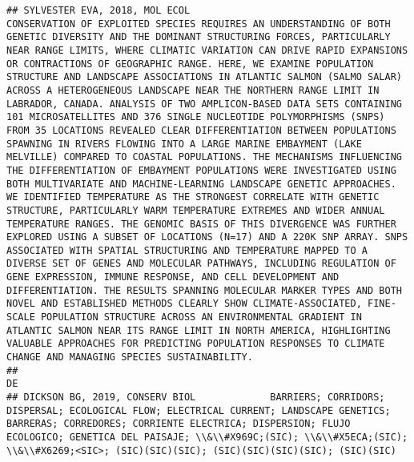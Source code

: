 \documentclass[]{article}
\begin{document}
\begin{verbatim}
## SYLVESTER EVA, 2018, MOL ECOL                                                                                                                                                                                                                                                                                                                                                                                                                                                                                                           CONSERVATION OF EXPLOITED SPECIES REQUIRES AN UNDERSTANDING OF BOTH GENETIC DIVERSITY AND THE DOMINANT STRUCTURING FORCES, PARTICULARLY NEAR RANGE LIMITS, WHERE CLIMATIC VARIATION CAN DRIVE RAPID EXPANSIONS OR CONTRACTIONS OF GEOGRAPHIC RANGE. HERE, WE EXAMINE POPULATION STRUCTURE AND LANDSCAPE ASSOCIATIONS IN ATLANTIC SALMON (SALMO SALAR) ACROSS A HETEROGENEOUS LANDSCAPE NEAR THE NORTHERN RANGE LIMIT IN LABRADOR, CANADA. ANALYSIS OF TWO AMPLICON-BASED DATA SETS CONTAINING 101 MICROSATELLITES AND 376 SINGLE NUCLEOTIDE POLYMORPHISMS (SNPS) FROM 35 LOCATIONS REVEALED CLEAR DIFFERENTIATION BETWEEN POPULATIONS SPAWNING IN RIVERS FLOWING INTO A LARGE MARINE EMBAYMENT (LAKE MELVILLE) COMPARED TO COASTAL POPULATIONS. THE MECHANISMS INFLUENCING THE DIFFERENTIATION OF EMBAYMENT POPULATIONS WERE INVESTIGATED USING BOTH MULTIVARIATE AND MACHINE-LEARNING LANDSCAPE GENETIC APPROACHES. WE IDENTIFIED TEMPERATURE AS THE STRONGEST CORRELATE WITH GENETIC STRUCTURE, PARTICULARLY WARM TEMPERATURE EXTREMES AND WIDER ANNUAL TEMPERATURE RANGES. THE GENOMIC BASIS OF THIS DIVERGENCE WAS FURTHER EXPLORED USING A SUBSET OF LOCATIONS (N=17) AND A 220K SNP ARRAY. SNPS ASSOCIATED WITH SPATIAL STRUCTURING AND TEMPERATURE MAPPED TO A DIVERSE SET OF GENES AND MOLECULAR PATHWAYS, INCLUDING REGULATION OF GENE EXPRESSION, IMMUNE RESPONSE, AND CELL DEVELOPMENT AND DIFFERENTIATION. THE RESULTS SPANNING MOLECULAR MARKER TYPES AND BOTH NOVEL AND ESTABLISHED METHODS CLEARLY SHOW CLIMATE-ASSOCIATED, FINE-SCALE POPULATION STRUCTURE ACROSS AN ENVIRONMENTAL GRADIENT IN ATLANTIC SALMON NEAR ITS RANGE LIMIT IN NORTH AMERICA, HIGHLIGHTING VALUABLE APPROACHES FOR PREDICTING POPULATION RESPONSES TO CLIMATE CHANGE AND MANAGING SPECIES SUSTAINABILITY.
##                                                                                                                                                                                                                                                                                                                                           DE
## DICKSON BG, 2019, CONSERV BIOL             BARRIERS; CORRIDORS; DISPERSAL; ECOLOGICAL FLOW; ELECTRICAL CURRENT; LANDSCAPE GENETICS; BARRERAS; CORREDORES; CORRIENTE ELECTRICA; DISPERSION; FLUJO ECOLOGICO; GENETICA DEL PAISAJE; \\&\\#X969C;(SIC); \\&\\#X5ECA;(SIC); \\&\\#X6269;<SIC>; (SIC)(SIC)(SIC); (SIC)(SIC)(SIC)(SIC); (SIC)(SIC)

\end{verbatim}
\end{document}
